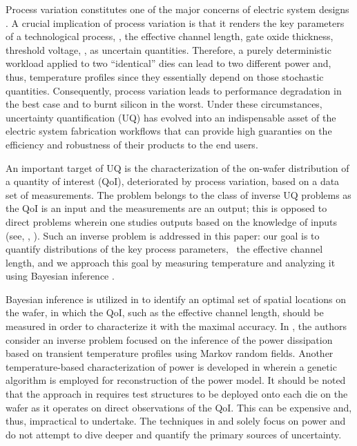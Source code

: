Process variation constitutes one of the major concerns of electric system designs \cite{srivastava2010}. A crucial implication of process variation is that it renders the key parameters of a technological process, \eg, the effective channel length, gate oxide thickness, threshold voltage, \etc, as uncertain quantities.
Therefore, a purely deterministic workload applied to two ``identical'' dies can lead to two different power and, thus, temperature profiles since they essentially depend on those stochastic quantities. Consequently, process variation leads to performance degradation in the best case and to burnt silicon in the worst.
Under these circumstances, uncertainty quantification (UQ) has evolved into an indispensable asset of the electric system fabrication workflows that can provide high guaranties on the efficiency and robustness of their products to the end users.

An important target of UQ is the characterization of the on-wafer distribution of a quantity of interest (QoI), deteriorated by process variation, based on a data set of measurements. The problem belongs to the class of inverse UQ problems as the QoI is an input and the measurements are an output; this is opposed to direct problems wherein one studies outputs based on the knowledge of inputs (see, \eg, \cite{juan2011, juan2012}).
Such an inverse problem is addressed in this paper: our goal is to quantify distributions of the key process parameters, \eg\ the effective channel length, and we approach this goal by measuring temperature and analyzing it using Bayesian inference \cite{gelman2004}.

Bayesian inference is utilized in \cite{zhang2010} to identify an optimal set of spatial locations on the wafer, in which the QoI, such as the effective channel length, should be measured in order to characterize it with the maximal accuracy.
In \cite{paek2012}, the authors consider an inverse problem focused on the inference of the power dissipation based on transient temperature profiles using Markov random fields.
Another temperature-based characterization of power is developed in \cite{mesa-martinez2007} wherein a genetic algorithm is employed for reconstruction of the power model.
It should be noted that the approach in \cite{zhang2010} requires test structures to be deployed onto each die on the wafer as it operates on direct observations of the QoI. This can be expensive and, thus, impractical to undertake. The techniques in \cite{paek2012} and \cite{mesa-martinez2007} solely focus on power and do not attempt to dive deeper and quantify the primary sources of uncertainty.

